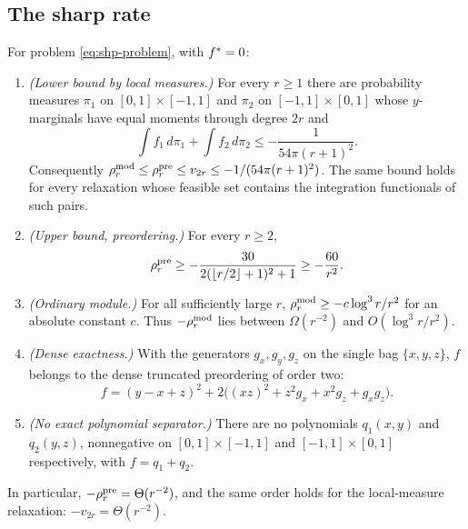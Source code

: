 \subsection{The sharp rate}\label{sec:shp-rate}

\begin{theorem}
\label{thm:quad-sharp}
For problem \eqref{eq:shp-problem}, with $f^{*}=0$:
\begin{enumerate}[label=(\alph*)]
\item \emph{(Lower bound by local measures.)} For every $r\ge1$ there are
  probability measures $\pi_1$ on $[0,1]\times[-1,1]$ and $\pi_2$ on
  $[-1,1]\times[0,1]$ whose $y$-marginals have equal moments through
  degree $2r$ and
  \[
    \int f_1\,d\pi_1+\int f_2\,d\pi_2\le-\frac1{54\pi(r+1)^2}.
  \]
  Consequently
  $\rho^{\mathrm{mod}}_r\le\rho^{\mathrm{pre}}_r\le v_{2r}\le-1/(54\pi(r+1)^2)$. The same bound
  holds for every relaxation whose feasible set contains the integration
  functionals of such pairs.
\item \emph{(Upper bound, preordering.)} For every $r\ge2$,
  \[
    \rho^{\mathrm{pre}}_r\ge-\frac{30}{2(\lfloor r/2\rfloor+1)^2+1}\ge-\frac{60}{r^2}.
  \]
\item \emph{(Ordinary module.)} For all sufficiently large $r$,
  $\rho^{\mathrm{mod}}_r\ge-c\log^3r/r^2$ for an absolute constant $c$. Thus
  $-\rho^{\mathrm{mod}}_r$ lies between $\Omega(r^{-2})$ and $O(\log^3r/r^2)$.
\item \emph{(Dense exactness.)} With the generators $g_x,g_y,g_z$ on the
  single bag $\{x,y,z\}$, $f$ belongs to the dense truncated preordering of
  order two:
  \begin{equation}\label{eq:shp-dense}
    f=(y-x+z)^2+2\bigl((xz)^2+z^2g_x+x^2g_z+g_xg_z\bigr).
  \end{equation}
\item \emph{(No exact polynomial separator.)} There are no polynomials
  $q_1(x,y)$ and $q_2(y,z)$, nonnegative on $[0,1]\times[-1,1]$ and
  $[-1,1]\times[0,1]$ respectively, with $f=q_1+q_2$.
\end{enumerate}
In particular, $-\rho^{\mathrm{pre}}_r=\Theta(r^{-2})$, and the same order holds for the
local-measure relaxation: $-v_{2r}=\Theta(r^{-2})$.
\end{theorem}

